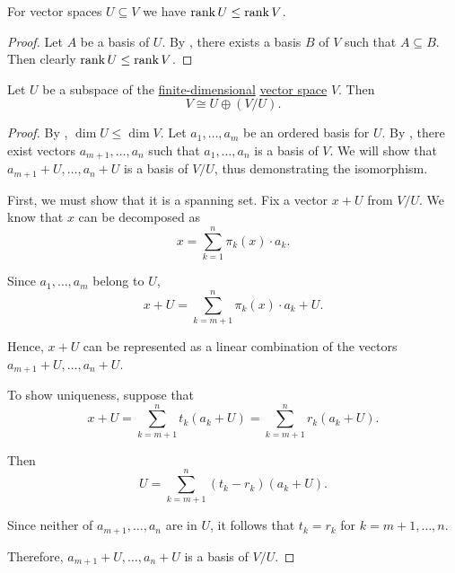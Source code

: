 \begin{lemma}\label{thm:vector_space_dimension_monotonicity}
  For vector spaces \( U \subseteq V \) we have \( \operatorname{rank} U \leq \operatorname{rank} V \).
\end{lemma}
\begin{proof}
  Let \( A \) be a basis of \( U \). By , there exists a basis \( B \) of \( V \) such that \( A \subseteq B \). Then clearly \( \operatorname{rank} U \leq \operatorname{rank} V \).
\end{proof}

\begin{proposition}\label{thm:rank_nullity_via_subspaces}
  Let \( U \) be a subspace of the \hyperref[thm:vector_space_dimension]{finite-dimensional} \hyperref[def:vector_space]{vector space} \( V \). Then
  \begin{equation*}
    V \cong U \oplus (V / U).
  \end{equation*}
\end{proposition}
\begin{proof}
  By , \( \dim U \leq \dim V \). Let \( a_1, \ldots, a_m \) be an ordered basis for \( U \). By , there exist vectors \( a_{m+1}, \ldots, a_n \) such that \( a_1, \ldots, a_n \) is a basis of \( V \). We will show that \( a_{m+1} + U, \ldots, a_n + U \) is a basis of \( V / U \), thus demonstrating the isomorphism.

  First, we must show that it is a spanning set. Fix a vector \( x + U \) from \( V / U \). We know that \( x \) can be decomposed as
  \begin{equation*}
    x = \sum_{k=1}^n \pi_k(x) \cdot a_k.
  \end{equation*}

  Since \( a_1, \ldots, a_m \) belong to \( U \),
  \begin{equation*}
    x + U = \sum_{k={m+1}}^n \pi_k(x) \cdot a_k + U.
  \end{equation*}

  Hence, \( x + U \) can be represented as a linear combination of the vectors \( a_{m+1} + U, \ldots, a_n + U \).

  To show uniqueness, suppose that
  \begin{equation*}
    x + U = \sum_{k={m+1}}^n t_k (a_k + U) = \sum_{k={m+1}}^n r_k (a_k + U).
  \end{equation*}

  Then
  \begin{equation*}
    U = \sum_{k={m+1}}^n (t_k - r_k) (a_k + U).
  \end{equation*}

  Since neither of \( a_{m+1}, \ldots, a_n \) are in \( U \), it follows that \( t_k = r_k \) for \( k = m + 1, \ldots, n \).

  Therefore, \( a_{m+1} + U, \ldots, a_n + U \) is a basis of \( V / U \).
\end{proof}

